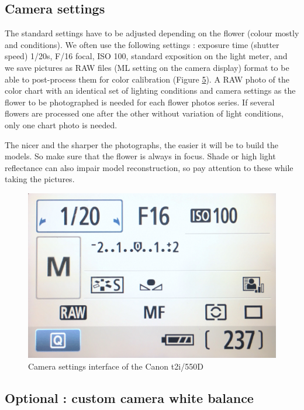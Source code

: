 \documentclass[
]{book}
\theoremstyle{definition}
\theoremstyle{definition}
\theoremstyle{definition}
\theoremstyle{definition}
\theoremstyle{remark}
\begin{document}
\hypertarget{camera-settings}{%
\subsection{Camera settings}\label{camera-settings}}

The standard settings have to be adjusted depending on the flower
(colour mostly and conditions). We often use the following settings :
exposure time (shutter speed) 1/20s, F/16 focal, ISO 100, standard
exposition on the light meter, and we save pictures as RAW files (ML
setting on the camera display) format to be able to post-process them
for color calibration (Figure \protect\hyperlink{fig:my_label}{5}). A RAW photo of the color chart with an
identical set of lighting conditions and camera settings as the flower
to be photographed is needed for each flower photos series. If several
flowers are processed one after the other without variation of light
conditions, only one chart photo is needed.

The nicer and the sharper the photographs, the easier it will be to
build the models. So make sure that the flower is always in focus. Shade
or high light reflectance can also impair model reconstruction, so pay
attention to these while taking the pictures.

\begin{figure}
\hypertarget{fig:my_label}{%
\centering
\includegraphics{Figures/camera_settings.JPG}
\caption{Camera settings interface of the Canon
t2i/550D}\label{fig:my_label}
}
\end{figure}

\hypertarget{optional-custom-camera-white-balance}{%
\subsection{Optional : custom camera white balance}\label{optional-custom-camera-white-balance}}
\end{document}
